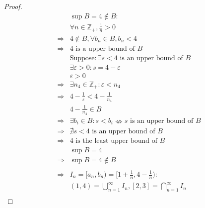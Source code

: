 \documentclass{article}
\begin{document}
\begin{proof}
\begin{align*}
        &\sup B=4\notin B:\\
        &\forall n\in\mathbb{Z} _+,\frac{1}{n}>0\\
        \Rightarrow&4\notin B,\forall b_n\in B, b_n<4\\
        \Rightarrow&4\text{ is a upper bound of }B\\
        &\text{Suppose}:\exists s<4 \text{ is an upper bound of }B\\
        &\exists \varepsilon>0: s=4-\varepsilon\\
        &\varepsilon>0\\
        \Rightarrow&\exists n_4\in\mathbb{Z} _+:\varepsilon<n_4\\
        \Rightarrow&4-\frac{1}{\varepsilon}<4-\frac{1}{n_4}\\
        &4-\frac{1}{n_4}\in B\\
        \Rightarrow&\exists b_i\in B:s<b_i\nLeftrightarrow s \text{ is an upper bound of }B\\
        \Rightarrow&\nexists s<4\text{ is an upper bound of }B\\
        \Rightarrow&4\text{ is the least upper bound of }B\\
        &\sup B=4\\
        \Rightarrow&\sup B=4\notin B\\
        &\\
        \Rightarrow&I_n=[a_n,b_n)=[1+\frac{1}{n},4-\frac{1}{n}):\\
        &(1,4)=\bigcup_{n=1}^{\infty}I_n,[2,3]=\bigcap_{n=1}^{\infty}I_n\\
    \end{align*}
\end{proof}
\end{document}
